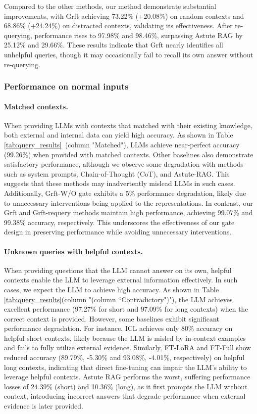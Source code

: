 Compared to the other methods, our method demonstrate substantial improvements, with Grft achieving 73.22\% (+20.08\%) on random contexts and 68.86\% (+24.24\%) on distracted contexts, validating its effectiveness. After re-querying, performance rises to 97.98\% and 98.46\%, surpassing Astute RAG by 25.12\% and 29.66\%. These results indicate that Grft nearly identifies all unhelpful queries, though it may occasionally fail to recall its own answer without re-querying.


\subsubsection{Performance on normal inputs}



\paragraph{Matched contexts.} When providing LLMs with contexts that matched with their existing knowledge, both external and internal data can yield high accuracy. As shown in Table \ref{tab:query_results}~(column "Matched"), LLMs achieve near-perfect accuracy (99.26\%) when provided with matched contexts. Other baselines also demonstrate satisfactory performance, although we observe some degradation with methods such as system prompts, Chain-of-Thought (CoT), and Astute-RAG. This suggests that these methods may inadvertently mislead LLMs in such cases. Additionally, Grft-W/O gate exhibits a 5\% performance degradation, likely due to unnecessary interventions being applied to the representations. In contrast, our Grft and Grft-requery methods maintain high performance, achieving 99.07\% and 99.38\% accuracy, respectively. This underscores the effectiveness of our gate design in preserving performance while avoiding unnecessary interventions.


\paragraph{Unknown queries with helpful contexts.}When providing questions that the LLM cannot answer on its own, helpful contexts enable the LLM to leverage external information effectively. In such cases, we expect the LLM to achieve high accuracy. As shown in Table \ref{tab:query_results}(column "(column ``Contradictory")"), the LLM achieves excellent performance (97.27\% for short and 97.09\% for long contexts) when the correct context is provided. However, some baselines exhibit significant performance degradation. For instance, ICL achieves only 80\% accuracy on helpful short contexts, likely because the LLM is misled by in-context examples and fails to fully utilize external evidence. Similarly, FT-LoRA and FT-Full show reduced accuracy (89.79\%, -5.30\% and 93.08\%, -4.01\%, respectively) on helpful long contexts, indicating that direct fine-tuning can impair the LLM's ability to leverage helpful contexts. Astute RAG performs the worst, suffering performance losses of 24.39\% (short) and 10.36\% (long), as it first prompts the LLM without context, introducing incorrect answers that degrade performance when external evidence is later provided. 

